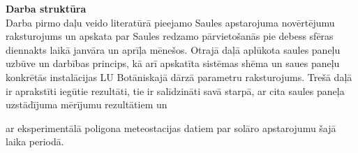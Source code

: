 \textbf{Darba struktūra}\\
Darba pirmo daļu veido literatūrā pieejamo Saules apstarojuma novērtējumu raksturojums un apskata par Saules redzamo pārvietošanās pie debess sfēras diennakts laikā janvāra un aprīļa mēnešos. Otrajā daļā aplūkota saules paneļu uzbūve un darbības princips, kā arī apskatīta sistēmas shēma un saues paneļu konkrētās instalācijas LU Botāniskajā dārzā parametru raksturojums.
Trešā daļā ir aprakstīti iegūtie rezultāti, tie ir salīdzināti savā starpā, ar cita saules paneļa uzstādījuma mērījumu rezultātiem un 


ar eksperimentālā poligona meteostacijas datiem par solāro apstarojumu šajā laika periodā.



